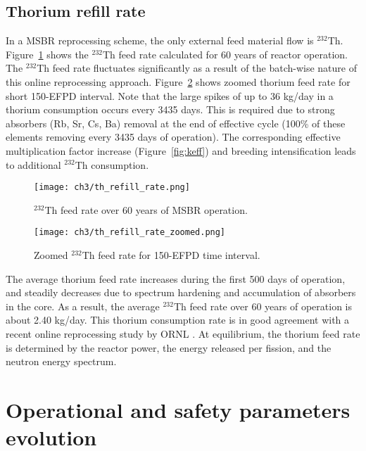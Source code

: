 \subsection{Thorium refill rate}
In a \gls{MSBR} reprocessing scheme, the only external feed material flow  is 
$^{232}$Th. Figure~\ref{fig:th_refill} shows the $^{232}$Th feed rate 
calculated for 60 years of reactor operation. The $^{232}$Th feed rate 
fluctuates significantly as a result of the batch-wise nature of this online 
reprocessing approach. Figure~\ref{fig:th_refill_zoomed} shows zoomed thorium 
feed rate for short 150-EFPD interval. Note that the large spikes of up to 36 
kg/day in a thorium consumption occurs every 3435 days. This is required due to 
strong absorbers (Rb, Sr, Cs, Ba) removal at the end of effective cycle (100\% 
of these elements removing every 3435 days of operation). The corresponding 
effective multiplication factor increase (Figure~\ref{fig:keff}) and breeding 
intensification leads to additional $^{232}$Th consumption.  
\begin{figure}[ht!] %
	\texttt{[image: ch3/th\_refill\_rate.png]} 
	\caption{$^{232}$Th feed rate over 60 years of \gls{MSBR} operation.}
	\label{fig:th_refill}
\end{figure}
\begin{figure}[ht!] %
	\texttt{[image: ch3/th\_refill\_rate\_zoomed.png]} 
	\caption{Zoomed $^{232}$Th feed rate for 150-EFPD time interval.}
	\label{fig:th_refill_zoomed}
\end{figure}

The average thorium feed rate increases during the first 500 days of operation, 
and steadily decreases due to spectrum hardening and accumulation of absorbers 
in the core. As a result, the average $^{232}$Th feed rate over 60 years of 
operation is about 2.40 kg/day. This thorium consumption rate is in good 
agreement with a recent online reprocessing study by \gls{ORNL} 
\cite{betzler_molten_2017}. At equilibrium, the thorium feed rate is determined 
by the reactor power, the energy released per fission, and the neutron energy 
spectrum.


\section{Operational and safety parameters evolution}
